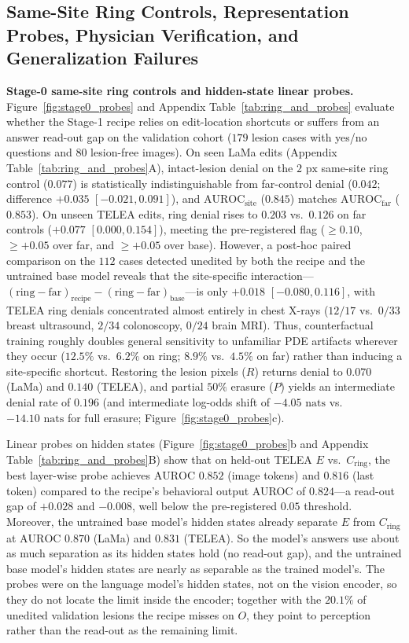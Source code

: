 \documentclass[5p,times,twocolumn,authoryear]{elsarticle}
\begin{document}
\subsection{Same-Site Ring Controls, Representation Probes, Physician Verification, and Generalization Failures}
\label{subsec:exp_probes_readers_failures}
\textbf{Stage-0 same-site ring controls and hidden-state linear probes.} Figure~\ref{fig:stage0_probes} and Appendix Table~\ref{tab:ring_and_probes} evaluate whether the Stage-1 recipe relies on edit-location shortcuts or suffers from an answer read-out gap on the validation cohort ($179$ lesion cases with yes/no questions and $80$ lesion-free images). On seen LaMa edits (Appendix Table~\ref{tab:ring_and_probes}A), intact-lesion denial on the $2\text{ px}$ same-site ring control ($0.077$) is statistically indistinguishable from far-control denial ($0.042$; difference $+0.035$ $[-0.021, 0.091]$), and $\text{AUROC}_{\text{site}}$ ($0.845$) matches $\text{AUROC}_{\text{far}}$ ($0.853$). On unseen TELEA edits, ring denial rises to $0.203$ vs.\ $0.126$ on far controls ($+0.077$ $[0.000, 0.154]$), meeting the pre-registered flag ($\ge 0.10$, $\ge +0.05$ over far, and $\ge +0.05$ over base). However, a post-hoc paired comparison on the $112$ cases detected unedited by both the recipe and the untrained base model reveals that the site-specific interaction---$(\text{ring} - \text{far})_{\text{recipe}} - (\text{ring} - \text{far})_{\text{base}}$---is only $+0.018$ $[-0.080, 0.116]$, with TELEA ring denials concentrated almost entirely in chest X-rays ($12/17$ vs.\ $0/33$ breast ultrasound, $2/34$ colonoscopy, $0/24$ brain MRI). Thus, counterfactual training roughly doubles general sensitivity to unfamiliar PDE artifacts wherever they occur ($12.5\%$ vs.\ $6.2\%$ on ring; $8.9\%$ vs.\ $4.5\%$ on far) rather than inducing a site-specific shortcut. Restoring the lesion pixels ($R$) returns denial to $0.070$ (LaMa) and $0.140$ (TELEA), and partial $50\%$ erasure ($P$) yields an intermediate denial rate of $0.196$ (and intermediate log-odds shift of $-4.05\text{ nats}$ vs.\ $-14.10\text{ nats}$ for full erasure; Figure~\ref{fig:stage0_probes}c).

Linear probes on hidden states (Figure~\ref{fig:stage0_probes}b and Appendix Table~\ref{tab:ring_and_probes}B) show that on held-out TELEA $E$ vs.\ $C_{\text{ring}}$, the best layer-wise probe achieves $\text{AUROC } 0.852$ (image tokens) and $0.816$ (last token) compared to the recipe's behavioral output AUROC of $0.824$---a read-out gap of $+0.028$ and $-0.008$, well below the pre-registered $0.05$ threshold. Moreover, the untrained base model's hidden states already separate $E$ from $C_{\text{ring}}$ at $\text{AUROC } 0.870$ (LaMa) and $0.831$ (TELEA). So the model's answers use about as much separation as its hidden states hold (no read-out gap), and the untrained base model's hidden states are nearly as separable as the trained model's. The probes were on the language model's hidden states, not on the vision encoder, so they do not locate the limit inside the encoder; together with the $20.1\%$ of unedited validation lesions the recipe misses on $O$, they point to perception rather than the read-out as the remaining limit.
\end{document}
